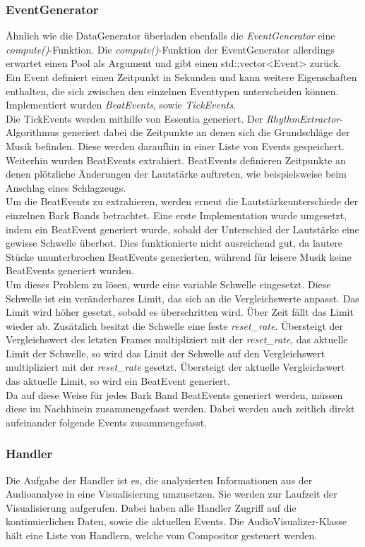 \documentclass[11pt,a4paper]{article}
\begin{document}
\subsubsection{EventGenerator}
Ähnlich wie die DataGenerator überladen ebenfalls die \textit{EventGenerator} eine \textit{compute()}-Funktion. Die \textit{compute()}-Funktion der EventGenerator allerdings erwartet einen Pool als Argument und gibt einen std::vector<Event> zurück.\\
Ein Event definiert einen Zeitpunkt in Sekunden und kann weitere Eigenschaften enthalten, die sich zwischen den einzelnen Eventtypen unterscheiden können. Implementiert wurden \textit{BeatEvents}, sowie \textit{TickEvents}.\\
Die TickEvents werden mithilfe von Essentia generiert. Der \textit{RhythmExtractor}-Algorithmus generiert dabei die Zeitpunkte an denen sich die Grundschläge der Musik befinden. Diese werden daraufhin in einer Liste von Events gespeichert.\\
Weiterhin wurden BeatEvents extrahiert. BeatEvents definieren Zeitpunkte an denen plötzliche Änderungen der Lautstärke auftreten, wie beispielsweise beim Anschlag eines Schlagzeugs.\\
Um die BeatEvents zu extrahieren, werden erneut die Lautstärkeunterschiede der einzelnen Bark Bands betrachtet. Eine erste Implementation wurde umgesetzt, indem ein BeatEvent generiert wurde, sobald der Unterschied der Lautstärke eine gewisse Schwelle überbot. Dies funktionierte nicht ausreichend gut, da lautere Stücke ununterbrochen BeatEvents generierten, während für leisere Musik keine BeatEvents generiert wurden.\\
Um dieses Problem zu lösen, wurde eine variable Schwelle eingesetzt. Diese Schwelle ist ein veränderbares Limit, das sich an die Vergleichswerte anpasst. Das Limit wird höher gesetzt, sobald es überschritten wird. Über Zeit fällt das Limit wieder ab. Zusätzlich besitzt die Schwelle eine feste \textit{reset\_rate}. Übersteigt der Vergleichswert des letzten Frames multipliziert mit der \textit{reset\_rate}, das aktuelle Limit der Schwelle, so wird das Limit der Schwelle auf den Vergleichswert multipliziert mit der \textit{reset\_rate} gesetzt. Übersteigt der aktuelle Vergleichswert das aktuelle Limit, so wird ein BeatEvent generiert.\\
Da auf diese Weise für jedes Bark Band BeatEvents generiert werden, müssen diese im Nachhinein zusammengefasst werden. Dabei werden auch zeitlich direkt aufeinander folgende Events zusammengefasst.
\subsubsection{Handler}
Die Aufgabe der Handler ist es, die analysierten Informationen aus der Audioanalyse in eine Visualisierung umzusetzen. Sie werden zur Laufzeit der Visualisierung aufgerufen. Dabei haben alle Handler Zugriff auf die kontinuierlichen Daten, sowie die aktuellen Events. Die AudioVisualizer-Klasse hält eine Liste von Handlern, welche vom Compositor gesteuert werden.
\end{document}
